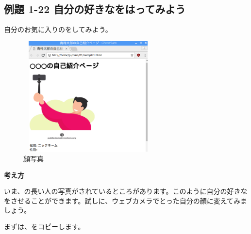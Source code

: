 \subsection{例題 1-22 自分の好きなをはってみよう}
自分のお気に入りのをしてみよう。

\centering
\begin{figure}[h]
  \centering
  \begin{minipage}{6.738cm}
    {\upshape
      \centering
      \includegraphics[width=7.071cm,height=6.048cm]{text01-img/textbook-img161.png}
      \caption{顔写真}
    }
  \end{minipage}
\end{figure}

\flushleft
\textbf{考え方}


いま、の長い人の写真がされているところがあります。このように自分の好きなをさせることができます。試しに、ウェブカメラでとった自分の顔に変えてみましょう。

まずは、をコピーします。


\bigskip

